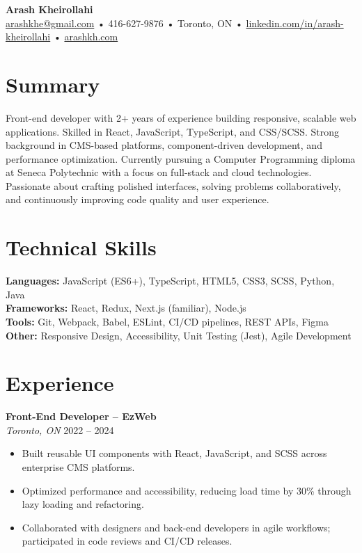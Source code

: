\documentclass[letterpaper,10pt]{article}
\begin{document}

{\LARGE \textbf{Arash Kheirollahi}}\\
\href{mailto:arashkhe@gmail.com}{arashkhe@gmail.com} • 416-627-9876 • Toronto, ON • \href{https://linkedin.com/in/arash-kheirollahi}{linkedin.com/in/arash-kheirollahi} • \href{https://arashkh.com}{arashkh.com}

\vspace{1em}

\section*{Summary}
Front-end developer with 2+ years of experience building responsive, scalable web applications. Skilled in React, JavaScript, TypeScript, and CSS/SCSS. Strong background in CMS-based platforms, component-driven development, and performance optimization. Currently pursuing a Computer Programming diploma at Seneca Polytechnic with a focus on full-stack and cloud technologies. Passionate about crafting polished interfaces, solving problems collaboratively, and continuously improving code quality and user experience.

\section*{Technical Skills}
\textbf{Languages:} JavaScript (ES6+), TypeScript, HTML5, CSS3, SCSS, Python, Java \\
\textbf{Frameworks:} React, Redux, Next.js (familiar), Node.js \\
\textbf{Tools:} Git, Webpack, Babel, ESLint, CI/CD pipelines, REST APIs, Figma \\
\textbf{Other:} Responsive Design, Accessibility, Unit Testing (Jest), Agile Development

\section*{Experience}
\textbf{Front-End Developer – EzWeb}\\
\textit{Toronto, ON} \hfill 2022 -- 2024
\begin{itemize}[leftmargin=*]
  \item Built reusable UI components with React, JavaScript, and SCSS across enterprise CMS platforms.
  \item Optimized performance and accessibility, reducing load time by 30\% through lazy loading and refactoring.
  \item Collaborated with designers and back-end developers in agile workflows; participated in code reviews and CI/CD releases.
\end{itemize}
\end{document}
